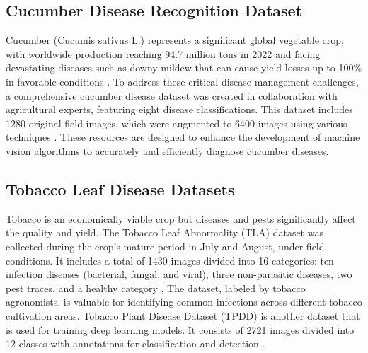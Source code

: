 \documentclass[sn-mathphys]{sn-jnl}
\theoremstyle{thmstyleone}%
\theoremstyle{thmstyletwo}%
\theoremstyle{thmstylethree}%
\begin{document}
\subsection{Cucumber Disease Recognition Dataset}
Cucumber (Cucumis sativus L.) represents a significant global vegetable crop, with worldwide production reaching 94.7 million tons in 2022 and facing devastating diseases such as downy mildew that can cause yield losses up to 100\% in favorable conditions \citep{abdelfatah2025control}. To address these critical disease management challenges, a comprehensive cucumber disease dataset was created in collaboration with agricultural experts, featuring eight disease classifications. This dataset includes 1280 original field images, which were augmented to 6400 images using various techniques \citep{sultana2023dataset}. These resources are designed to enhance the development of machine vision algorithms to accurately and efficiently diagnose cucumber diseases.

\subsection{Tobacco Leaf Disease Datasets}
Tobacco is an economically viable crop but diseases and pests significantly affect the quality and yield. The Tobacco Leaf Abnormality (TLA) dataset was collected during the crop's mature period in July and August, under field conditions. It includes a total of 1430 images divided into 16 categories: ten infection diseases (bacterial, fungal, and viral), three non-parasitic diseases, two pest traces, and a healthy category \citep{lin2024few}. The dataset, labeled by tobacco agronomists, is valuable for identifying common infections across different tobacco cultivation areas. Tobacco Plant Disease Dataset (TPDD) is another dataset that is used for training deep learning models. It consists of 2721 images divided into 12 classes with annotations for classification and detection \citep{tpdd}.
\end{document}
